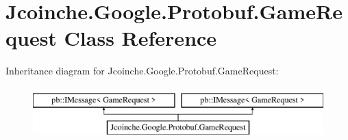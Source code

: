 \hypertarget{class_jcoinche_1_1_google_1_1_protobuf_1_1_game_request}{}\section{Jcoinche.\+Google.\+Protobuf.\+Game\+Request Class Reference}
\label{class_jcoinche_1_1_google_1_1_protobuf_1_1_game_request}
Inheritance diagram for Jcoinche.\+Google.\+Protobuf.\+Game\+Request\+:\begin{figure}[H]
\begin{center}
\leavevmode
\includegraphics[height=2.000000cm]{class_jcoinche_1_1_google_1_1_protobuf_1_1_game_request}
\end{center}
\end{figure}
